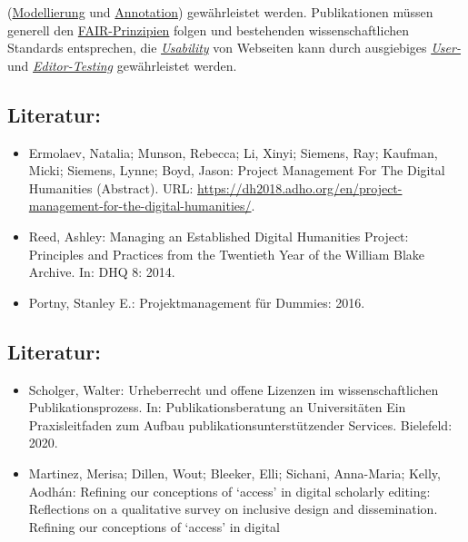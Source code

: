 \documentclass{article}
\begin{document}
\begin{itemize}
{                        (\href{http://gams.uni-graz.at/o:konde.137}{Modellierung} und \href{http://gams.uni-graz.at/o:konde.17}{Annotation}) gewährleistet werden.
                     Publikationen müssen generell den \href{http://gams.uni-graz.at/o:konde.7}{FAIR-Prinzipien} folgen und bestehenden wissenschaftlichen Standards
                     entsprechen, die \emph{\href{http://gams.uni-graz.at/o:konde.206}{Usability}} von Webseiten kann durch ausgiebiges \emph{\href{http://gams.uni-graz.at/o:konde.206}{User-}}
                     und \emph{\href{http://gams.uni-graz.at/o:konde.78}{Editor-Testing}} gewährleistet werden. }\end{itemize}\subsection*{Literatur:}\begin{itemize}\item Ermolaev, Natalia; Munson, Rebecca; Li, Xinyi; Siemens, Ray; Kaufman, Micki; Siemens, Lynne; Boyd, Jason: Project Management For The Digital Humanities
                              (Abstract). URL: \url{https://dh2018.adho.org/en/project-management-for-the-digital-humanities/}.\item Reed, Ashley: Managing an Established Digital Humanities Project:
                              Principles and Practices from the Twentieth Year of the William Blake
                              Archive. In: DHQ 8: 2014.\item Portny, Stanley E.: Projektmanagement für Dummies: 2016.\end{itemize}\subsection*{Literatur:}\begin{itemize}\item Scholger, Walter: Urheberrecht und offene Lizenzen im wissenschaftlichen
                              Publikationsprozess. In: Publikationsberatung an Universitäten Ein
                              Praxisleitfaden zum Aufbau publikationsunterstützender
                              Services. Bielefeld: 2020.\item Martinez, Merisa; Dillen, Wout; Bleeker, Elli; Sichani, Anna-Maria; Kelly, Aodhán: Refining our conceptions of ‘access’ in digital
                              scholarly editing: Reflections on a qualitative survey on inclusive
                              design and dissemination. Refining our conceptions of ‘access’ in digital

\end{itemize}
\end{document}

